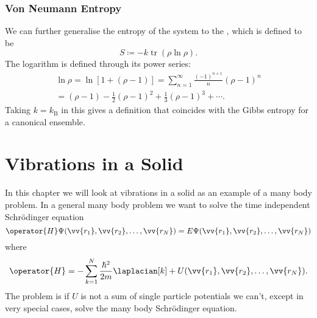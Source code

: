\documentclass[fleqn]{NotesClass}
\newcommand*{\boltzmann}{k_{\mathrm{B}}}
\DeclareMathOperator{\tr}{tr}
\begin{document}
    \subsection{Von Neumann Entropy}
    We can further generalise the entropy of the system to the , which is defined to be
    \begin{equation}
        S \coloneqq -k\tr(\rho\ln \rho).
    \end{equation}
    The logarithm is defined through its power series:
    \begin{multline}
        \ln \rho = \ln[1 + (\rho - 1)] = \sum_{n = 1}^{\infty} \frac{(-1)^{n + 1}}{n}(\rho - 1)^n\\
        = (\rho - 1) - \frac{1}{2}(\rho - 1)^2 + \frac{1}{3}(\rho - 1)^3 + \dotsb.
    \end{multline}
    Taking \(k = \boltzmann\) in this gives a definition that coincides with the Gibbs entropy for a canonical ensemble.
    
    \chapter{Vibrations in a Solid}
    In this chapter we will look at vibrations in a solid as an example of a many body problem.
    In a general many body problem we want to solve the time independent Schrödinger equation
    \begin{equation}
        \operator{H}\Psi(\vv{r_1}, \vv{r_2}, \dotsc, \vv{r_N}) = E\Psi(\vv{r_1}, \vv{r_2}, \dotsc, \vv{r_N})
    \end{equation}
    where
    \begin{equation}
        \operator{H} = -\sum_{k = 1}^{N} \frac{\hbar^2}{2m} \laplacian[k] + U(\vv{r_1}, \vv{r_2}, \dotsc, \vv{r_N}).
    \end{equation}
    The problem is if \(U\) is not a sum of single particle potentials we can't, except in very special cases, solve the many body Schrödinger equation.
    
\end{document}

